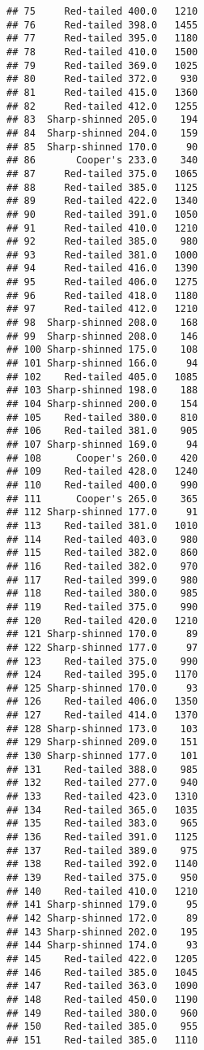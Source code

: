 \documentclass[
]{article}
\begin{document}
\begin{verbatim}
## 75     Red-tailed 400.0   1210
## 76     Red-tailed 398.0   1455
## 77     Red-tailed 395.0   1180
## 78     Red-tailed 410.0   1500
## 79     Red-tailed 369.0   1025
## 80     Red-tailed 372.0    930
## 81     Red-tailed 415.0   1360
## 82     Red-tailed 412.0   1255
## 83  Sharp-shinned 205.0    194
## 84  Sharp-shinned 204.0    159
## 85  Sharp-shinned 170.0     90
## 86       Cooper's 233.0    340
## 87     Red-tailed 375.0   1065
## 88     Red-tailed 385.0   1125
## 89     Red-tailed 422.0   1340
## 90     Red-tailed 391.0   1050
## 91     Red-tailed 410.0   1210
## 92     Red-tailed 385.0    980
## 93     Red-tailed 381.0   1000
## 94     Red-tailed 416.0   1390
## 95     Red-tailed 406.0   1275
## 96     Red-tailed 418.0   1180
## 97     Red-tailed 412.0   1210
## 98  Sharp-shinned 208.0    168
## 99  Sharp-shinned 208.0    146
## 100 Sharp-shinned 175.0    108
## 101 Sharp-shinned 166.0     94
## 102    Red-tailed 405.0   1085
## 103 Sharp-shinned 198.0    188
## 104 Sharp-shinned 200.0    154
## 105    Red-tailed 380.0    810
## 106    Red-tailed 381.0    905
## 107 Sharp-shinned 169.0     94
## 108      Cooper's 260.0    420
## 109    Red-tailed 428.0   1240
## 110    Red-tailed 400.0    990
## 111      Cooper's 265.0    365
## 112 Sharp-shinned 177.0     91
## 113    Red-tailed 381.0   1010
## 114    Red-tailed 403.0    980
## 115    Red-tailed 382.0    860
## 116    Red-tailed 382.0    970
## 117    Red-tailed 399.0    980
## 118    Red-tailed 380.0    985
## 119    Red-tailed 375.0    990
## 120    Red-tailed 420.0   1210
## 121 Sharp-shinned 170.0     89
## 122 Sharp-shinned 177.0     97
## 123    Red-tailed 375.0    990
## 124    Red-tailed 395.0   1170
## 125 Sharp-shinned 170.0     93
## 126    Red-tailed 406.0   1350
## 127    Red-tailed 414.0   1370
## 128 Sharp-shinned 173.0    103
## 129 Sharp-shinned 209.0    151
## 130 Sharp-shinned 177.0    101
## 131    Red-tailed 388.0    985
## 132    Red-tailed 277.0    940
## 133    Red-tailed 423.0   1310
## 134    Red-tailed 365.0   1035
## 135    Red-tailed 383.0    965
## 136    Red-tailed 391.0   1125
## 137    Red-tailed 389.0    975
## 138    Red-tailed 392.0   1140
## 139    Red-tailed 375.0    950
## 140    Red-tailed 410.0   1210
## 141 Sharp-shinned 179.0     95
## 142 Sharp-shinned 172.0     89
## 143 Sharp-shinned 202.0    195
## 144 Sharp-shinned 174.0     93
## 145    Red-tailed 422.0   1205
## 146    Red-tailed 385.0   1045
## 147    Red-tailed 363.0   1090
## 148    Red-tailed 450.0   1190
## 149    Red-tailed 380.0    960
## 150    Red-tailed 385.0    955
## 151    Red-tailed 385.0   1110

\end{verbatim}
\end{document}
